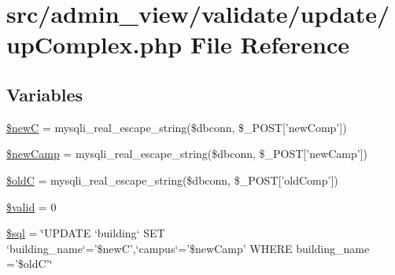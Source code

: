 \hypertarget{upComplex_8php}{\section{src/admin\-\_\-view/validate/update/up\-Complex.php \-File \-Reference}
\label{upComplex_8php}
}
\subsection*{\-Variables}
\begin{DoxyCompactItemize}
\item 
\hyperlink{upComplex_8php_ad06b2227b1785217614a1af1253505e0}{\$new\-C} = mysqli\-\_\-real\-\_\-escape\-\_\-string(\$dbconn, \$\-\_\-\-P\-O\-S\-T\mbox{[}'new\-Comp'\mbox{]})
\item 
\hyperlink{upComplex_8php_a62ac845b01c144c44951edea6fe6358e}{\$new\-Camp} = mysqli\-\_\-real\-\_\-escape\-\_\-string(\$dbconn, \$\-\_\-\-P\-O\-S\-T\mbox{[}'new\-Camp'\mbox{]})
\item 
\hyperlink{upComplex_8php_a50d27d31cd853f014465997ccb9a89f0}{\$old\-C} = mysqli\-\_\-real\-\_\-escape\-\_\-string(\$dbconn, \$\-\_\-\-P\-O\-S\-T\mbox{[}'old\-Comp'\mbox{]})
\item 
\hyperlink{upComplex_8php_a0587674d27d00ef497e08e53ccf45bbb}{\$valid} = 0
\item 
\hyperlink{upComplex_8php_a047170d6020a882807665812a27e2525}{\$sql} = \char`\"{}\-U\-P\-D\-A\-T\-E `building` \-S\-E\-T `building\-\_\-name`='\$new\-C',`campus`='\$new\-Camp' \-W\-H\-E\-R\-E building\-\_\-name ='\$old\-C'\char`\"{}
\end{DoxyCompactItemize}


